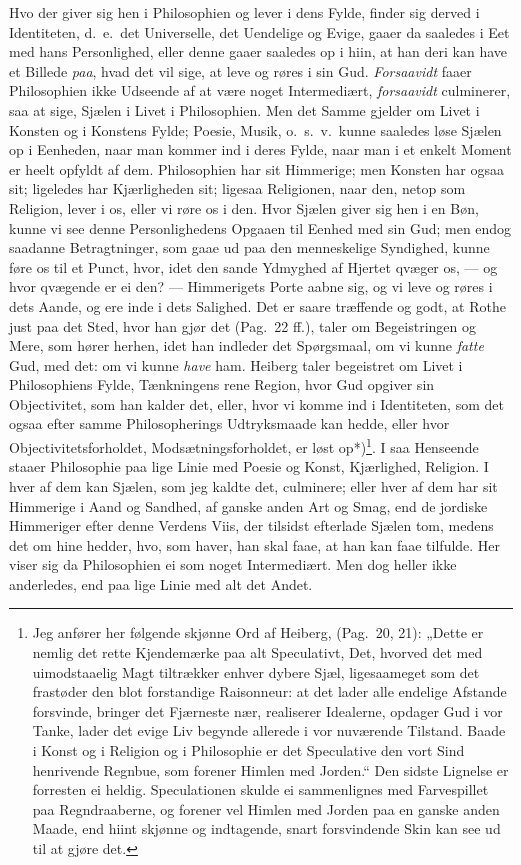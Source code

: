 \documentclass[12pt,a4paper]{book}
\newcommand{\apage}[1]{\marginnote{\footnotesize\textit{[#1]}}}
\begin{document}
Hvo der giver sig hen i Philosophien og lever i dens Fylde, finder
sig derved i Identiteten, d.\ e.\ det Universelle, det Uendelige og Evige,
gaaer da saaledes i Eet med hans Personlighed, eller denne gaaer saaledes op i
hiin, at han deri kan have et Billede \emph{paa}, hvad det vil sige, at leve og røres
i sin Gud. \emph{Forsaavidt} faaer Philosophien ikke Udseende af at være noget
Intermediært, \emph{forsaavidt} culminerer, saa at sige, Sjælen i Livet i
Philosophien. Men det Samme gjelder om Livet i Konsten og i Konstens Fylde;
Poesie, Musik, o.\ s.\ v.\ kunne saaledes løse Sjælen op i Eenheden, naar man
kommer ind i deres Fylde, naar man i et enkelt Moment er heelt opfyldt af dem.
Philosophien har sit Himmerige; men Konsten har ogsaa sit; ligeledes har
Kjærligheden sit; ligesaa Religionen, naar den, netop som Religion, lever i
os, eller vi røre os i den. Hvor Sjælen giver sig hen i en Bøn, kunne vi see
denne Personlighedens Opgaaen til Eenhed med sin Gud; men endog saadanne
Betragtninger, som gaae ud paa den menneskelige Syndighed, kunne føre os til
et Punct, hvor, idet den sande Ydmyghed af Hjertet qvæger os, --- og hvor
qvægende er ei den? --- Himmerigets Porte aabne sig, og vi leve og røres i
dets Aande, og ere inde i dets Salighed. Det er saare træffende og godt, at
Rothe just paa det Sted, hvor han gjør det (Pag.\ 22 ff.), taler om
Begeistringen og Mere, som hører herhen, idet han indleder det Spørgsmaal, om
vi kunne \emph{fatte} Gud, med det: om vi kunne \emph{have} ham. Heiberg taler begeistret om
Livet i Philosophiens Fylde, Tænkningens rene Region, hvor Gud opgiver sin
Objectivitet, som han kalder det, eller, hvor vi komme ind i Identiteten, som
det ogsaa efter samme Philosopherings Udtryksmaade \apage{117} kan hedde, eller hvor
Objectivitetsforholdet, Modsætningsforholdet, er løst op*)\footnote{Jeg anfører
her følgende skjønne Ord af Heiberg, (Pag.\ 20, 21): „Dette er nemlig det rette
Kjendemærke paa alt Speculativt, Det, hvorved det med uimodstaaelig Magt
tiltrækker enhver dybere Sjæl, ligesaameget som det frastøder den blot
forstandige Raisonneur: at det lader alle endelige Afstande forsvinde, bringer
det Fjærneste nær, realiserer Idealerne, opdager Gud i vor Tanke, lader det
evige Liv begynde allerede i vor nuværende Tilstand. Baade i Konst og i
Religion og i Philosophie er det Speculative den vort Sind henrivende Regnbue,
som forener Himlen med Jorden.“ Den sidste Lignelse er forresten ei heldig.
Speculationen skulde ei sammenlignes med Farvespillet paa Regndraaberne, og
forener vel Himlen med Jorden paa en ganske anden Maade, end hiint skjønne og
indtagende, snart forsvindende Skin kan see ud til at gjøre det.}. I saa
Henseende staaer Philosophie paa lige Linie med Poesie og Konst, Kjærlighed,
Religion. I hver af dem kan Sjælen, som jeg kaldte det, culminere; eller hver
af dem har sit Himmerige i Aand og Sandhed, af ganske anden Art og Smag, end
de jordiske Himmeriger efter denne Verdens Viis, der tilsidst efterlade Sjælen
tom, medens det om hine hedder, hvo, som haver, han skal faae, at han kan faae
tilfulde. Her viser sig da Philosophien ei som noget Intermediært. Men dog
heller ikke anderledes, end paa lige Linie med alt det Andet.
\end{document}
